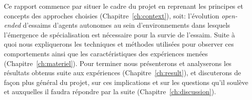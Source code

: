 \documentclass[a4paper,10pt]{report}
\begin{document}







Ce rapport commence par situer le cadre du projet en reprenant les principes et concepts des approches choisies (Chapitre~\ref{ch:context}), soit: l'évolution \emph{open-ended} d'essaims d'agents autonomes au sein d'environnements dans lesquels l'émergence de spécialisation est nécessaire pour la survie de l'essaim. Suite à quoi nous expliquerons les techniques et méthodes utilisées pour observer ces comportements ainsi que les caractéristiques des expériences menées (Chapitre~\ref{ch:materiel}). Pour terminer nous présenterons et analyserons les résultats obtenus suite aux expériences (Chapitre~\ref{ch:result}), et discuterons de fa\c con plus général du projet, sur ces implications et sur les questions qu'il soulève et auxquelles il faudra répondre par la suite (Chapitre~\ref{ch:discussion}).
\end{document}

